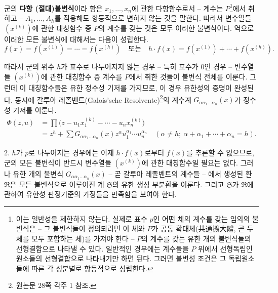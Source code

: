 군의 \textbf{다항 (절대)불변식}이라 함은 $x_1,\ldots,x_n$에 관한 다항함수로서 -- 계수는 $P$\footnote{이는 일반성을 제한하지 않는다. 실제로 표수 $p$인 어떤 체의 계수를 갖는 임의의 불변식은 -- 그 불변식들이 정의되려면 이 체와 $P$가 공통 확대체(共通擴大體, 곧 두 체를 모두 포함하는 체)를 가져야 한다 -- $P$의 계수를 갖는 유한 개의 불변식들의 선형결합으로 나타낼 수 있다. 일반적인 경우에는 계수들을 $P$ 위에서 선형독립인 원소들의 선형결합으로 나타내기만 하면 된다. 그러면 불변성 조건은 그 독립원소들에 따른 각 성분별로 항등적으로 성립한다.}에서 취하고 -- $A_1,\ldots,A_h$를 적용해도 항등적으로 변하지 않는 것을 말한다. 따라서 변수열들 $(x^{(k)})$에 관한 대칭함수 중 $P$의 계수를 갖는 것은 모두 이러한 불변식이다. 역으로 이러한 모든 불변식에 대해서는 다음이 성립한다.
\[
 f(x)=f(x^{(1)})=\cdots=f(x^{(h)})
 \quad\text{또는}\quad
 h\cdot f(x)=f(x^{(1)})+\cdots+f(x^{(h)}).
\]

따라서 군의 위수 $h$가 표수로 나누어지지 않는 경우 -- 특히 표수가 $0$인 경우 -- 변수열들 $(x^{(k)})$에 관한 대칭함수 중 계수를 $P$에서 취한 것들이 불변식 전체를 이룬다. 그런데 이 대칭함수들은 유한 정수성 기저를 가지므로, 이 경우 유한성의 증명이 완성된다. 동시에 갈루아 레졸벤트(Galois'sche Resolvente)\footnote{원논문 28쪽 각주 1 참조.}의 계수계 $G_{\alpha\alpha_1\ldots\alpha_n}(x)$가 정수성 기저를 이룬다.
\[
\begin{aligned}
\Phi(z,u)&=\prod\bigl(z-u_1x_1^{(k)}-\cdots-u_nx_n^{(k)}\bigr)\\
&=z^h+\sum G_{\alpha\alpha_1\ldots\alpha_n}(x)
 z^{\alpha}u_1^{\alpha_1}\cdots u_n^{\alpha_n}
 \quad(\alpha\ne h;\ \alpha+\alpha_1+\cdots+\alpha_n=h).
\end{aligned}
\]

2. $h$가 $p$로 나누어지는 경우에는 이제 $h\cdot f(x)$로부터 $f(x)$를 추론할 수 없으므로, 군의 모든 불변식이 반드시 변수열들 $(x^{(k)})$에 관한 대칭함수일 필요는 없다. 그러나 유한 개의 불변식 $G_{\alpha\alpha_1\ldots\alpha_n}(x)$ -- 곧 갈루아 레졸벤트의 계수들 -- 에서 생성된 환 $\mathfrak R$은 모든 불변식으로 이루어진 계 $\mathfrak S$의 유한 생성 부분환을 이룬다. 그리고 $\mathfrak S$가 $\mathfrak R$에 관하여 유한성 판정기준의 가정들을 만족함을 보여야 한다.

